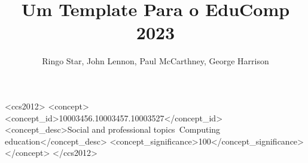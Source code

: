 \documentclass[sigconf]{educomp}
\begin{document}
\title[Título curto, caso necessário]{Um Template Para o EduComp 2023}


\author{Ringo Star, John Lennon, Paul McCarthney, George Harrison}

\renewcommand{\shortauthors}{-}

\newcommand{\showDOI}[1]{\unskip}


\begin{abstract}



\end{abstract}

\begin{CCSXML}
<ccs2012>
<concept>
<concept_id>10003456.10003457.10003527</concept_id>
<concept_desc>Social and professional topics~Computing education</concept_desc>
<concept_significance>100</concept_significance>
</concept>
</ccs2012>
\end{CCSXML}



\maketitle















\end{document}
